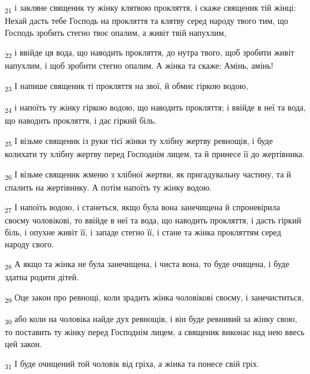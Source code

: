 \begin{tcolorbox}
\textsubscript{21} і закляне священик ту жінку клятвою прокляття, і скаже священик тій жінці: Нехай дасть тебе Господь на прокляття та клятву серед народу твого тим, що Господь зробить стегно твоє опалим, а живіт твій напухлим,
\end{tcolorbox}
\begin{tcolorbox}
\textsubscript{22} і ввійде ця вода, що наводить прокляття, до нутра твого, щоб зробити живіт напухлим, і щоб зробити стегно опалим. А жінка та скаже: Амінь, амінь!
\end{tcolorbox}
\begin{tcolorbox}
\textsubscript{23} І напише священик ті прокляття на звої, й обмиє гіркою водою,
\end{tcolorbox}
\begin{tcolorbox}
\textsubscript{24} і напоїть ту жінку гіркою водою, що наводить прокляття; і ввійде в неї та вода, що наводить прокляття, і дає гіркий біль.
\end{tcolorbox}
\begin{tcolorbox}
\textsubscript{25} І візьме священик із руки тієї жінки ту хлібну жертву ревнощів, і буде колихати ту хлібну жертву перед Господнім лицем, та й принесе її до жертівника.
\end{tcolorbox}
\begin{tcolorbox}
\textsubscript{26} І візьме священик жменю з хлібної жертви, як пригадувальну частину, та й спалить на жертівнику. А потім напоїть ту жінку водою.
\end{tcolorbox}
\begin{tcolorbox}
\textsubscript{27} І напоїть водою, і станеться, якщо була вона занечищена й спроневірила своєму чоловікові, то ввійде в неї та вода, що наводить прокляття, і дасть гіркий біль, і опухне живіт її, і западе стегно її, і стане та жінка прокляттям серед народу свого.
\end{tcolorbox}
\begin{tcolorbox}
\textsubscript{28} А якщо та жінка не була занечищена, і чиста вона, то буде очищена, і буде здатна родити дітей.
\end{tcolorbox}
\begin{tcolorbox}
\textsubscript{29} Оце закон про ревнощі, коли зрадить жінка чоловікові своєму, і занечиститься,
\end{tcolorbox}
\begin{tcolorbox}
\textsubscript{30} або коли на чоловіка найде дух ревнощів, і він буде ревнивий за жінку свою, то поставить ту жінку перед Господнім лицем, а священик виконає над нею ввесь цей закон.
\end{tcolorbox}
\begin{tcolorbox}
\textsubscript{31} І буде очищений той чоловік від гріха, а жінка та понесе свій гріх.
\end{tcolorbox}
